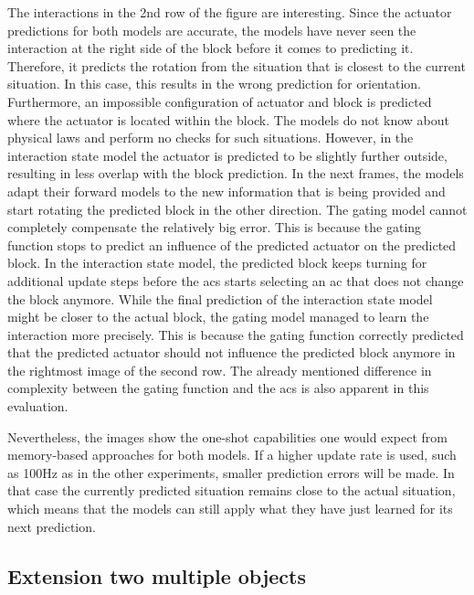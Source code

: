 The interactions in the 2nd row of the figure are interesting.
Since the actuator predictions for both models are accurate, the models have never seen the interaction at the right side of the block before it comes to predicting it. Therefore, it predicts the rotation from the situation that is closest to the current situation. In this case, this results in the wrong prediction for orientation.
Furthermore, an impossible configuration of actuator and block is predicted where the actuator is located within the block. 
The models do not know about physical laws and perform no checks for such situations.
However, in the interaction state model the actuator is predicted to be slightly further outside, resulting in less overlap with the block prediction. 
In the next frames, the models adapt their forward models to the new information that is being provided and start rotating the predicted block in the other direction. The gating model cannot completely compensate the relatively big error.
This is because the gating function stops to predict an influence of the predicted actuator on the predicted block.
In the interaction state model, the predicted block keeps turning for additional update steps before the \gls{acs} starts selecting an \gls{ac} that does not change the block anymore.
While the final prediction of the interaction state model might be closer to the actual block, the gating model managed to learn the interaction more precisely. This is because the gating function correctly predicted that the predicted actuator should not influence the predicted block anymore in the rightmost image of the second row.
The already mentioned difference in complexity between the gating function and the \gls{acs} is also apparent in this evaluation.

Nevertheless, the images show the one-shot capabilities one would expect from memory-based approaches for both models. If a higher update rate is used, such as 100Hz as in the other experiments, smaller prediction errors will be made. In that case the currently predicted situation remains close to the actual situation, which means that the models can still apply what they have just learned for its next prediction.


\subsection{Extension two multiple objects}

